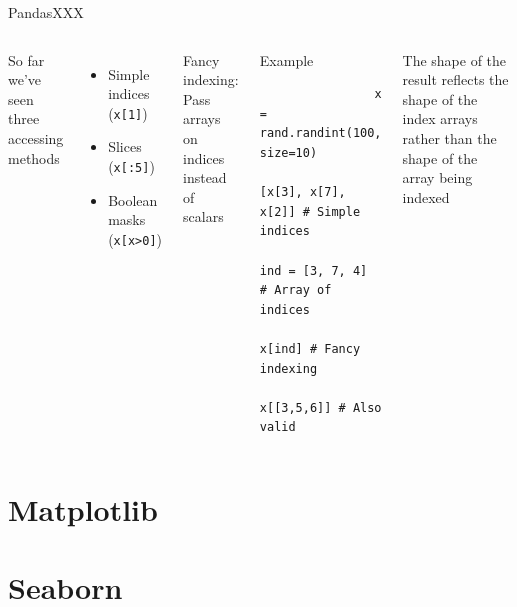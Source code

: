 \documentclass[10pt,compress]{beamer} %
\begin{document}
\begin{frame}[fragile]{Pandas}{XXX}
	\begin{columns}
	So far we've seen three accessing methods
	\begin{itemize}
		\item Simple indices (\texttt{x[1]})
		\item Slices (\texttt{x[:5]})
		\item Boolean masks (\texttt{x[x>0]})
	\end{itemize}
	Fancy indexing: Pass arrays on indices instead of scalars
		\begin{exampleblock}{\footnotesize{Example}}
		\vspace{-0.2cm} 
			\begin{lstlisting}
				x = rand.randint(100, size=10)
				[x[3], x[7], x[2]] # Simple indices
				ind = [3, 7, 4] # Array of indices
				x[ind] # Fancy indexing
				x[[3,5,6]] # Also valid
			\end{lstlisting}
		\vspace{-0.2cm} 
		\end{exampleblock}

		\footnotesize{
		\begin{alertblock}{}
		The shape of the result reflects the shape of the index arrays rather than the shape of the array being indexed
		\end{alertblock}
		}
	\end{columns}
\end{frame}


\section{Matplotlib}
\section{Seaborn}



	
\end{document}
